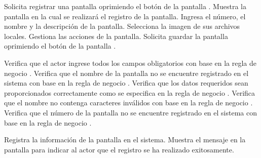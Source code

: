  \begin{UCtrayectoria}
    \UCpaso[\UCactor] Solicita registrar una pantalla oprimiendo el botón  de la pantalla .
    \UCpaso[\UCsist] Muestra la pantalla  en la cual se realizará el registro de la pantalla. 
    \UCpaso[\UCactor] Ingresa el número, el nombre y la descripción de la pantalla. \label{cu6.1:ingresaDatos}
    \UCpaso[\UCactor] Selecciona la imagen de sus archivos locales.\label{cu6.1:seleccionaImagen}
    \UCpaso[\UCactor] Gestiona las acciones de la pantalla.\label{cu6.1:gestionaAcciones}
    \UCpaso[\UCactor] Solicita guardar la pantalla oprimiendo el botón  de la pantalla .  
    
    \UCpaso[\UCsist] Verifica que el actor ingrese todos los campos obligatorios con base en la regla de negocio  . 
    \UCpaso[\UCsist] Verifica que el nombre de la pantalla no se encuentre registrado en el sistema con base en la regla de negocio  . 
    \UCpaso[\UCsist] Verifica que los datos requeridos sean proporcionados correctamente como se especifica en la regla de negocio .    
    \UCpaso[\UCsist] Verifica que el nombre no contenga caracteres inválidos con base en la regla de negocio . 
    \UCpaso[\UCsist] Verifica que el número de la pantalla no se encuentre registrado en el sistema con base en la regla de negocio  .     
    
    \UCpaso[\UCsist] Registra la información de la pantalla en el sistema.
    \UCpaso[\UCsist] Muestra el mensaje  en la pantalla 
    para indicar al actor que el registro se ha realizado exitosamente.
 \end{UCtrayectoria}
 
